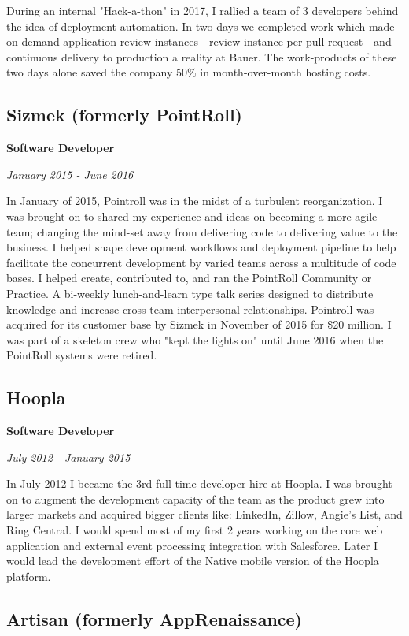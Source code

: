 \documentclass[12pt letterpaper notitlepage]{article}
\begin{document}
During an internal "Hack-a-thon" in 2017, I rallied a team of 3
developers behind the idea of deployment automation. In two days we
completed work which made on-demand application review instances -
review instance per pull request - and continuous delivery to
production a reality at Bauer. The work-products of these two days
alone saved the company 50\% in month-over-month hosting costs.

\subsection*{Sizmek (formerly PointRoll)}
\label{sec-2-2}

\textbf{Software Developer}

\emph{January 2015 - June 2016}

In January of 2015, Pointroll was in the midst of a turbulent reorganization. I
was brought on to shared my experience and ideas on becoming a more agile team;
changing the mind-set away from delivering code to delivering value to the
business. I helped shape development workflows and deployment pipeline to help
facilitate the concurrent development by varied teams across a multitude of code
bases. I helped create, contributed to, and ran the PointRoll Community or
Practice. A bi-weekly lunch-and-learn type talk series designed to distribute
knowledge and increase cross-team interpersonal relationships. Pointroll was
acquired for its customer base by Sizmek in November of 2015 for \$20 million. I
was part of a skeleton crew who "kept the lights on" until June 2016 when the
PointRoll systems were retired.

\subsection*{Hoopla}
\label{sec-2-3}

\textbf{Software Developer}

\emph{July 2012 - January 2015}

In July 2012 I became the 3rd full-time developer hire at Hoopla. I was brought
on to augment the development capacity of the team as the product grew into
larger markets and acquired bigger clients like: LinkedIn, Zillow, Angie's List,
and Ring Central. I would spend most of my first 2 years working on the core web
application and external event processing integration with Salesforce. Later I
would lead the development effort of the Native mobile version of the Hoopla
platform.

\subsection*{Artisan (formerly AppRenaissance)}
\label{sec-2-4}
\end{document}
